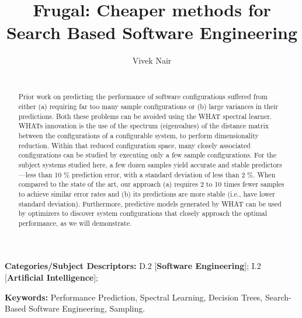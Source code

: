 \documentclass{newsig}
\begin{document}
\title{Frugal: Cheaper methods for Search Based Software Engineering} 
\author{
        \alignauthor Vivek Nair \\
        \\
               }
\maketitle 
\thispagestyle{plain}
\pagestyle{plain}
\begin{abstract}
Prior work on predicting the performance of software configurations
suffered from either (a) requiring far too many sample configurations or (b)
large variances in their predictions. Both these problems can be avoided
using the WHAT spectral learner. WHAT\textquotesingle s innovation is the use of the spectrum
(eigenvalues) of the distance matrix between the configurations of a configurable
system, to perform dimensionality reduction. Within that reduced configuration
space, many closely associated configurations can be studied by executing only
a few sample configurations. For the subject systems studied here, a few
dozen samples yield accurate and stable predictors—less than 10 \% prediction
error, with a standard deviation of less than 2 \%. When compared to the state of
the art, our approach (a) requires 2 to 10 times fewer samples to achieve similar
error rates and (b) its predictions are more stable (i.e., have lower standard
deviation). Furthermore, predictive models generated by WHAT can be used
by optimizers to discover system configurations that closely approach the
optimal performance, as we will demonstrate.
\end{abstract}

\vspace{1ex}
\noindent
{\bf Categories/Subject Descriptors:} 
D.2 [{\bf Software Engineering}];
I.2 [{\bf Artificial Intelligence}];

 
\vspace{1ex}
\noindent
{\bf Keywords:} Performance Prediction, 
Spectral Learning, 
Decision Trees,
Search-Based Software Engineering, 
Sampling.
 

 
\end{document}
